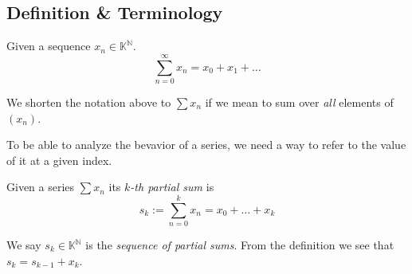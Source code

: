 \subsection{Definition \& Terminology}
\begin{definition}[Series]
   Given a sequence \(x_n \in \mathbb{K}^\mathbb{N}\).
   \[\sum_{n=0}^{\infty} x_n = x_0 + x_1 + \ldots\]
\end{definition}
\begin{remark}[Notation]
   We shorten the notation above to \(\sum x_n\) if we mean to sum over \emph{all} elements of \((x_n)\).
\end{remark}
To be able to analyze the bevavior of a series, we need a way to refer to the value of it at a given index.
\begin{definition}
   Given a series \(\sum x_n\) its \emph{\(k\)-th partial sum} is
   \[s_k := \sum_{n = 0}^{k} x_n = x_0 + \ldots + x_k\]
\end{definition}
\begin{remark}[Terminology]
   We say \(s_k \in \mathbb{K}^\mathbb{N}\) is the \emph{sequence of partial sums}.
   From the definition we see that \(s_k =  s_{k-1} + x_k\).
\end{remark}

